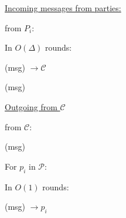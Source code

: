 \begin{bbox}[title={$\mathcal{W}_{contract} (\mathcal{P}=P_1,...,P_n, \mathcal{C}, \Delta)$}]

\underline{Incoming messages from parties:}
\vspace{2mm}

\OnInput {} from $P_i$:
	\begin{renumerate}
		\item In $O(\Delta)$ rounds:
			
			\quad \Send (msg) $\rightarrow \mathcal{C}$
		\item \Leak (msg)
	\end{renumerate}

\underline{Outgoing from $\mathcal{C}$}
\vspace{2mm}

\OnInput {} from $\mathcal{C}$:
	\begin{renumerate}
		\item \Leak (msg)
		\item For $p_i$ in $\mathcal{P}$:
		\begin{renumerate}
			\item In $O(1)$ rounds:

			\quad \Send (msg) $\rightarrow p_i$
		\end{renumerate}
	\end{renumerate}
\end{bbox}
